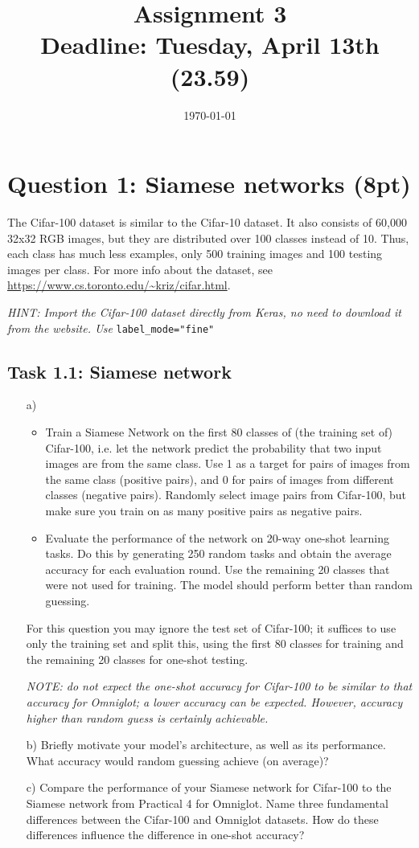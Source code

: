 \documentclass[a4paper,twoside,10pt]{article}
\title{\vspace{-\baselineskip}\sffamily\bfseries Assignment 3 \\
\large Deadline: Tuesday, April 13th (23.59)}
\date{\today}
\begin{document}
\maketitle

\section*{Question 1: Siamese networks (8pt)}
The Cifar-100 dataset is similar to the Cifar-10 dataset. It also consists of 60,000 32x32 RGB images, but they are distributed over 100 classes instead of 10. Thus, each class has much less examples, only 500 training images and 100 testing images per class. For more info about the dataset, see \url{https://www.cs.toronto.edu/~kriz/cifar.html}.

\emph{HINT: Import the Cifar-100 dataset directly from Keras, no need to download it from the website. Use} \texttt{label\_mode="fine"}

\subsection*{Task 1.1: Siamese network}
\begin{itemize}
	\item[a)] \begin{itemize}
		\item Train a Siamese Network on the first 80 classes of (the training set of) Cifar-100, i.e. let the network predict the probability that two input images are from the same class. Use 1 as a target for pairs of images from the same class (positive pairs), and 0 for pairs of images from different classes (negative pairs). Randomly select image pairs from Cifar-100, but make sure you train on as many positive pairs as negative pairs.
		\item Evaluate the performance of the network on 20-way one-shot learning tasks. Do this by generating 250 random tasks and obtain the average accuracy for each evaluation round. Use the remaining 20 classes that were not used for training. The model should perform better than random guessing.
		\end{itemize}
	For this question you may ignore the test set of Cifar-100; it suffices to use only the training set and split this, using the first 80 classes for training and the remaining 20 classes for one-shot testing.

	\emph{NOTE: do not expect the one-shot accuracy for Cifar-100 to be similar to that accuracy for Omniglot; a lower accuracy can be expected. However, accuracy higher than random guess is certainly achievable.}
	\item[b)] Briefly motivate your model's architecture, as well as its performance. What accuracy would random guessing achieve (on average)?
	\item[c)] Compare the performance of your Siamese network for Cifar-100 to the Siamese network from Practical 4 for Omniglot. Name three fundamental differences between the Cifar-100 and Omniglot datasets. How do these differences influence the difference in one-shot accuracy?
\end{itemize}
\end{document}
